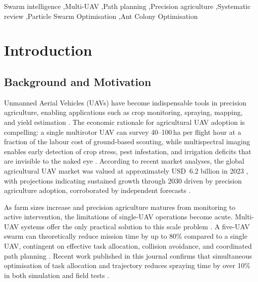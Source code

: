\documentclass[review,3p]{elsarticle}
\begin{document}
\begin{frontmatter}
\begin{keyword}
Swarm intelligence \sep Multi-UAV \sep Path planning \sep Precision agriculture
\sep Systematic review \sep Particle Swarm Optimisation \sep Ant Colony Optimisation
\end{keyword}

\end{frontmatter}

\section{Introduction}

\subsection{Background and Motivation}

Unmanned Aerial Vehicles (UAVs) have become indispensable tools in precision
agriculture, enabling applications such as crop monitoring, spraying, mapping,
and yield estimation \cite{zhang2012,tsouros2019,puri2017,mogili2018,hunt2018}.
The economic rationale for agricultural UAV adoption is compelling: a single
multirotor UAV can survey 40--100\,ha per flight hour at a fraction of the
labour cost of ground-based scouting, while multispectral imaging enables early
detection of crop stress, pest infestation, and irrigation deficits that are
invisible to the naked eye \cite{hunt2018,zhang2012}. According to recent market
analyses, the global agricultural UAV market was valued at approximately
USD~6.2 billion in 2023 \cite{grand_view_research2024}, with projections
indicating sustained growth through 2030 driven by precision agriculture
adoption, corroborated by independent forecasts \cite{marketsandmarkets2023}.

As farm sizes increase and precision agriculture matures from monitoring to
active intervention, the limitations of single-UAV operations become acute.
Multi-UAV systems offer the only practical solution to this scale problem
\cite{chung2018,gupta2016}. A five-UAV swarm can theoretically reduce mission
time by up to 80\% compared to a single UAV, contingent on effective task
allocation, collision avoidance, and coordinated path planning \cite{chung2018}.
Recent work published in this journal confirms that simultaneous optimisation of
task allocation and trajectory reduces spraying time by over 10\% in both
simulation and field tests \cite{huang2023}.
\end{document}
